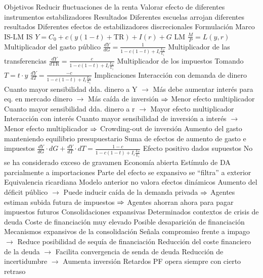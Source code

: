 \documentclass{nuevotema}
\begin{document}
\begin{esquemal}
			\3 Objetivos
				\4 Reducir fluctuaciones de la renta
				\4 Valorar efecto de diferentes instrumentos estabilizadores
			\3 Resultados
				\4 Diferentes escuelas arrojan diferentes resultados
				\4 Diferentes efectos de estabilizadores discrecionales
		\2 Formulación
			\3 Marco IS-LM
				\4 IS
				\4[] $Y = C_0 + c(y(1-t)+\text{TR})+I(r) + G$
				\4 LM
				\4[] $\frac{M}{P} = L(y,r)$
				\4 Multiplicador del gasto público
				\4[] $\frac{d Y}{d G} = \frac{1}{1-c(1-t) + I_i \frac{L_Y}{L_i}}$
				\4 Multiplicador de las transferencias
				\4[] $\frac{d Y}{d \text{TR}} = \frac{c}{1-c(1-t) + I_i \frac{L_Y}{L_i}}$
				\4 Multiplicador de los impuestos
				\4[] Tomando $T=t\cdot y$
				\4[] $\frac{d Y}{d T} = \frac{-c}{1-c(1-t) + I_i \frac{L_Y}{L_i}}$
		\2 Implicaciones
			\3 Interacción con demanda de dinero
				\4 Cuanto mayor sensibilidad dda. dinero a Y
				\4[] $\to$ Más debe aumentar interés para eq. en mercado dinero
				\4[] $\to$ Más caída de inversión
				\4[] $\then$ Menor efecto multiplicador
				\4 Cuanto mayor sensibilidad dda. dinero a r
				\4[] $\to$ Mayor efecto multiplicador
			\3 Interacción con interés
				\4 Cuanto mayor sensibilidad de inversión a interés
				\4[] $\to$ Menor efecto multiplicador
				\4[] $\then$ Crowding-out de inversión
			\3 Aumento del gasto manteniendo equilibrio presupuestario
				\4 Suma de efectos de aumento de gasto e impuestos
				\4[] $\frac{d Y}{d G} \cdot d G + \frac{d Y}{d T} \cdot d T = \frac{1-c}{1-c(1-t) + I_i \frac{L_Y}{L_i}}$
				\4[$\then$] Efecto positivo dados supuestos
				\4[$\then$] No se ha considerado exceso de gravamen
			\3 Economía abierta
				\4 Estímulo de DA parcialmente a importaciones
				\4 Parte del efecto se expansivo se ``filtra'' a exterior
			\3 Equivalencia ricardiana
				\4 Modelo anterior no valora efectos dinámicos
				\4[] Aumento del déficit público
				\4[] $\to$ Puede inducir caída de la demanda privada
				\4[] $\then$ Agentes estiman subida futura de impuestos
				\4[] $\then$ Agentes ahorran ahora para pagar impuestos futuros
			\3 Consolidaciones expansivas
				\4 Determinados contextos de crisis de deuda
				\4[] Coste de financiación muy elevado
				\4[] Posible desaparición de financiación
				\4 Mecanismos expansivos de la consolidación
				\4[] Señala compromiso frente a impago
				\4[] $\to$ Reduce posibilidad de sequía de financiación
				\4[] Reducción del coste financiero de la deuda
				\4[] $\to$ Facilita convergencia de senda de deuda
				\4[] Reducción de incertidumbre
				\4[] $\to$ Aumenta inversión
			\3 Retardos
				\4 PF opera siempre con cierto retraso

\end{esquemal}
\end{document}
